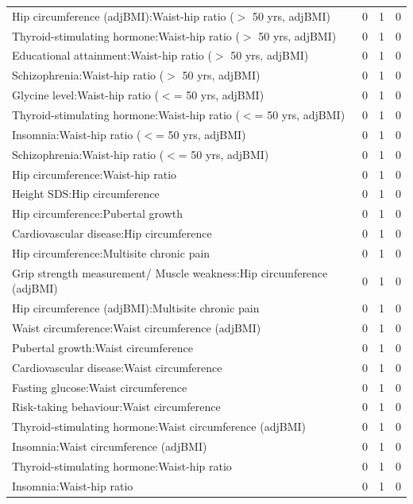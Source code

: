 \begin{table}[ht]
\begin{tabular}{lrrr}
  Hip circumference (adjBMI):Waist-hip ratio ($>$ 50 yrs, adjBMI) &   0 &   1 &   0 \\ 
  Thyroid-stimulating hormone:Waist-hip ratio ($>$ 50 yrs, adjBMI) &   0 &   1 &   0 \\ 
  Educational attainment:Waist-hip ratio ($>$ 50 yrs, adjBMI) &   0 &   1 &   0 \\ 
  Schizophrenia:Waist-hip ratio ($>$ 50 yrs, adjBMI) &   0 &   1 &   0 \\ 
  Glycine level:Waist-hip ratio ($<$= 50 yrs, adjBMI) &   0 &   1 &   0 \\ 
  Thyroid-stimulating hormone:Waist-hip ratio ($<$= 50 yrs, adjBMI) &   0 &   1 &   0 \\ 
  Insomnia:Waist-hip ratio ($<$= 50 yrs, adjBMI) &   0 &   1 &   0 \\ 
  Schizophrenia:Waist-hip ratio ($<$= 50 yrs, adjBMI) &   0 &   1 &   0 \\ 
  Hip circumference:Waist-hip ratio &   0 &   1 &   0 \\ 
  Height SDS:Hip circumference &   0 &   1 &   0 \\ 
  Hip circumference:Pubertal growth &   0 &   1 &   0 \\ 
  Cardiovascular disease:Hip circumference &   0 &   1 &   0 \\ 
  Hip circumference:Multisite chronic pain &   0 &   1 &   0 \\ 
  Grip strength measurement/ Muscle weakness:Hip circumference (adjBMI) &   0 &   1 &   0 \\ 
  Hip circumference (adjBMI):Multisite chronic pain &   0 &   1 &   0 \\ 
  Waist circumference:Waist circumference (adjBMI) &   0 &   1 &   0 \\ 
  Pubertal growth:Waist circumference &   0 &   1 &   0 \\ 
  Cardiovascular disease:Waist circumference &   0 &   1 &   0 \\ 
  Fasting glucose:Waist circumference &   0 &   1 &   0 \\ 
  Risk-taking behaviour:Waist circumference &   0 &   1 &   0 \\ 
  Thyroid-stimulating hormone:Waist circumference (adjBMI) &   0 &   1 &   0 \\ 
  Insomnia:Waist circumference (adjBMI) &   0 &   1 &   0 \\ 
  Thyroid-stimulating hormone:Waist-hip ratio &   0 &   1 &   0 \\ 
  Insomnia:Waist-hip ratio &   0 &   1 &   0 \\ 

\end{tabular}
\end{table}
